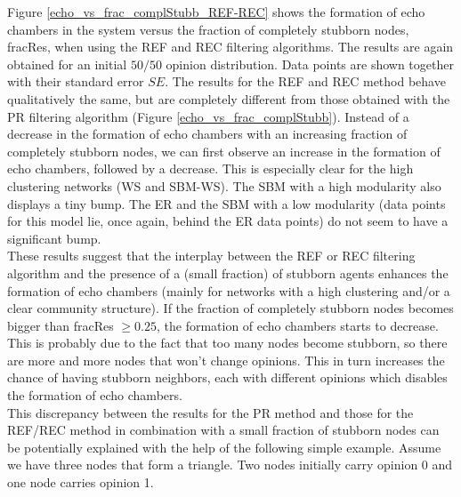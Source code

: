 \documentclass[11 pt , letterpaper , twoside , openright]{book}
\begin{document}
\noindent
Figure \ref{echo_vs_frac_complStubb_REF-REC} shows the formation of echo chambers in the system versus the fraction of completely stubborn nodes, fracRes, when using the REF and REC filtering algorithms. The results are again obtained for an initial $50/50$ opinion distribution. Data points are shown together with their standard error $SE$. The results for the REF and REC method behave qualitatively the same, but are completely different from those obtained with the PR filtering algorithm (Figure \ref{echo_vs_frac_complStubb}). Instead of a decrease in the formation of echo chambers with an increasing fraction of completely stubborn nodes, we can first observe an increase in the formation of echo chambers, followed by a decrease. This is especially clear for the high clustering networks (WS and SBM-WS). The SBM with a high modularity also displays a tiny bump. The ER and the SBM with a low modularity (data points for this model lie, once again, behind the ER data points) do not seem to have a significant bump.\\
These results suggest that the interplay between the REF or REC filtering algorithm and the presence of a (small fraction) of stubborn agents enhances the formation of echo chambers (mainly for networks with a high clustering and/or a clear community structure). %
If the fraction of completely stubborn nodes becomes bigger than fracRes $\geqslant 0.25$, the formation of echo chambers starts to decrease. This is probably due to the fact that too many nodes become stubborn, so there are more and more nodes that won't change opinions. This in turn increases the chance of having stubborn neighbors, each with different opinions which disables the formation of echo chambers.\\
\newline
This discrepancy between the results for the PR method and those for the REF/REC method in combination with a small fraction of stubborn nodes can be potentially explained with the help of the following simple example. Assume we have three nodes that form a triangle. Two nodes initially carry opinion 0 and one node carries opinion 1.\\
\end{document}
